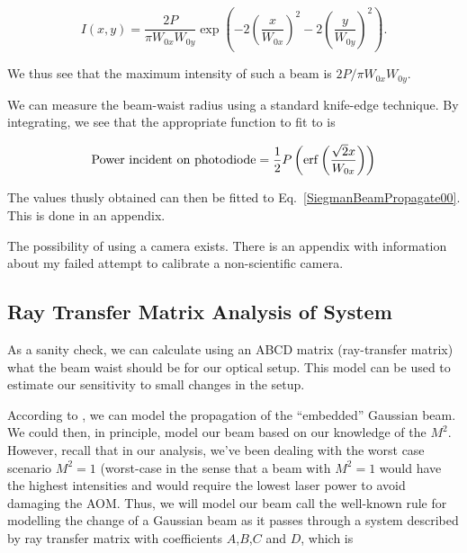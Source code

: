 \begin{equation}
I(x,y)= \frac{2 P}{\pi W_{0x} W_{0y}}\exp \left( -2 \left(\frac{x}{W_{0x}} \right)^2-2 \left( \frac{y}{W_{0y}}\right)^2\right). \label{intensityEquation2}
\end{equation}

We thus see that the maximum intensity of such a beam is $2P/\pi W_{0x}W_{0y}$.

We can measure the beam-waist radius using a standard knife-edge technique. By integrating, we see that the appropriate function to fit to is 

\begin{equation}
{\rm Power\ incident\ on\ photodiode}=\frac{1}{2} P \left(\erf \left( \frac{\sqrt{2} x}{W_{0x}}\right)\right)
\end{equation}


The values thusly obtained can then be fitted to Eq.\ \ref{SiegmanBeamPropagate00}. This is done in an appendix. 


The possibility of using a camera exists. There is an appendix with information about my failed attempt to calibrate a non-scientific camera. 


\subsection{Ray Transfer Matrix Analysis of System}
As a sanity check, we can calculate using an ABCD matrix (ray-transfer matrix) what the beam waist should be for our optical setup. This model can be used to estimate our sensitivity to small changes in the setup. 


According to \cite{SiegmanBeamQuality}, we can model the propagation of the ``embedded'' Gaussian beam. We could then, in principle, model our beam based on our knowledge of the $M^2$. However, recall that in our analysis, we've been dealing with the worst case scenario $M^2=1$ (worst-case in the sense that a beam with $M^2=1$ would have the highest intensities and would require the lowest laser power to avoid damaging the AOM. Thus, we will model our beam call the well-known rule for modelling the change of a Gaussian beam as it passes through a system described by ray transfer matrix with coefficients $A$,$B$,$C$ and $D$, which is 

